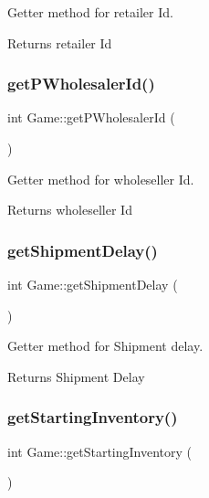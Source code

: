 Getter method for retailer Id. 

\begin{DoxyReturn}{Returns}
retailer Id 
\end{DoxyReturn}
\mbox{\label{class_game_a7a93d4a8c499ee090efd397fc068a3c4}} 
\subsubsection{\texorpdfstring{get\+P\+Wholesaler\+Id()}{getPWholesalerId()}}
{\footnotesize\ttfamily int Game\+::get\+P\+Wholesaler\+Id (\begin{DoxyParamCaption}{ }\end{DoxyParamCaption})}



Getter method for wholeseller Id. 

\begin{DoxyReturn}{Returns}
wholeseller Id 
\end{DoxyReturn}
\mbox{\label{class_game_a9e3acf4f2ee399be2eb047ed036bc24f}} 
\subsubsection{\texorpdfstring{get\+Shipment\+Delay()}{getShipmentDelay()}}
{\footnotesize\ttfamily int Game\+::get\+Shipment\+Delay (\begin{DoxyParamCaption}{ }\end{DoxyParamCaption})}



Getter method for Shipment delay. 

\begin{DoxyReturn}{Returns}
Shipment Delay 
\end{DoxyReturn}
\mbox{\label{class_game_aab81a9ebaccae9567297d73a44204e0d}} 
\subsubsection{\texorpdfstring{get\+Starting\+Inventory()}{getStartingInventory()}}
{\footnotesize\ttfamily int Game\+::get\+Starting\+Inventory (\begin{DoxyParamCaption}{ }\end{DoxyParamCaption})}



